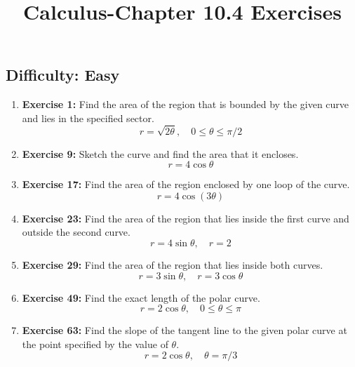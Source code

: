\usepackage{amsmath}
\usepackage{amssymb}
\usepackage{kotex} %
\usepackage{geometry}
\geometry{a4paper, margin=1in}

\title{Calculus-Chapter 10.4 Exercises}
\author{}
\date{}


\maketitle
\hrulefill
\vspace{1em}

\subsection*{Difficulty: Easy}

\begin{enumerate}
    \item \textbf{Exercise 1:} Find the area of the region that is bounded by the given curve and lies in the specified sector.
    \[ r = \sqrt{2\theta}, \quad 0 \le \theta \le \pi/2 \]

    \item \textbf{Exercise 9:} Sketch the curve and find the area that it encloses.
    \[ r = 4\cos\theta \]

    \item \textbf{Exercise 17:} Find the area of the region enclosed by one loop of the curve.
    \[ r = 4\cos(3\theta) \]

    \item \textbf{Exercise 23:} Find the area of the region that lies inside the first curve and outside the second curve.
    \[ r = 4\sin\theta, \quad r = 2 \]

    \item \textbf{Exercise 29:} Find the area of the region that lies inside both curves.
    \[ r = 3\sin\theta, \quad r = 3\cos\theta \]

    \item \textbf{Exercise 49:} Find the exact length of the polar curve.
    \[ r = 2\cos\theta, \quad 0 \le \theta \le \pi \]

    \item \textbf{Exercise 63:} Find the slope of the tangent line to the given polar curve at the point specified by the value of $\theta$.
    \[ r = 2\cos\theta, \quad \theta = \pi/3 \]
\end{enumerate}

\hrulefill
\vspace{1em}

